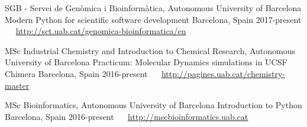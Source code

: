 


\begin{cventries}

  \cventry
    {SGB - Servei de Genòmica i Bioinformàtica, Autonomous University of Barcelona} %
    {Modern Python for scientific software development} %
    {Barcelona, Spain} %
    {2017-present} %
    {~~ \footnotesize{\href{http://sct.uab.cat/genomica-bioinformatica/en}{\faGlobe \acvHeaderIconSep http://sct.uab.cat/genomica-bioinformatica/en}}}

  \cventry
    {MSc Industrial Chemistry and Introduction to Chemical Research, Autonomous University of Barcelona} %
    {Practicum: Molecular Dynamics simulations in UCSF Chimera} %
    {Barcelona, Spain} %
    {2016-present} %
    {~~ \footnotesize{\href{http://pagines.uab.cat/chemistry-master}{\faGlobe \acvHeaderIconSep http://pagines.uab.cat/chemistry-master}}}

  \cventry
    {MSc Bioinformatics, Autonomous University of Barcelona} %
    {Introduction to Python} %
    {Barcelona, Spain} %
    {2016-present} %
    {~~ \footnotesize{\href{http://mscbioinformatics.uab.cat}{\faGlobe \acvHeaderIconSep http://mscbioinformatics.uab.cat}}}

\end{cventries}
